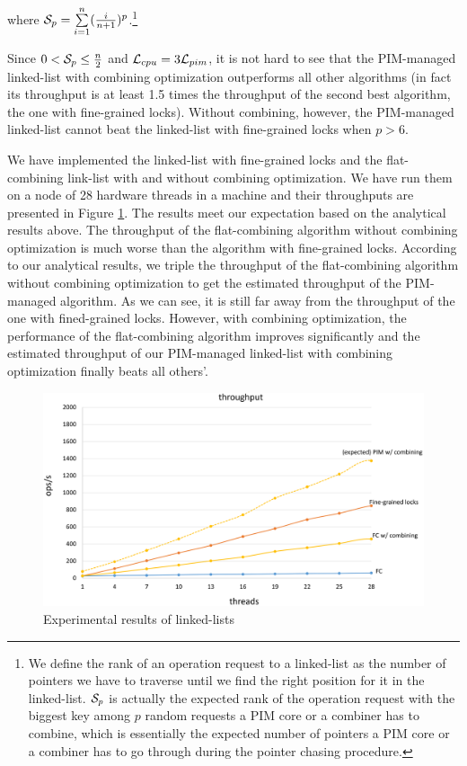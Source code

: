 where $\mathcal{S}_{p} = \sum\limits_{i=1}^{n} ({i \over n+1})^{p}$.\footnote {
We define the rank of an operation request to a linked-list as the number of pointers
we have to traverse until we find the right position for it in the linked-list.
$\mathcal{S}_{p}$ is actually the expected rank of the operation request with the biggest key
among $p$ random requests a PIM core or a combiner has to combine,
which is essentially the expected number of pointers a PIM core or a combiner
has to go through during the pointer chasing procedure.}

Since $0 < \mathcal{S}_{p} \le {n \over 2}$ and $\mathcal{L}_{cpu} = 3\mathcal{L}_{pim}$,
it is not hard to see that the PIM-managed linked-list with
combining optimization outperforms all other algorithms
(in fact its throughput is at least 1.5 times the throughput of
the second best algorithm, the one with fine-grained locks).
Without combining, however, the PIM-managed linked-list cannot
beat the linked-list with fine-grained locks when $p > 6$.

We have implemented the linked-list with fine-grained locks
and the flat-combining link-list with and without combining optimization.
We have run them on a node of 28 hardware threads in a machine
and their throughputs are presented in Figure \ref{figure:linkedlist_data}.
The results meet our expectation based on the analytical results above.
The throughput of the flat-combining algorithm without combining optimization
is much worse than the algorithm with fine-grained locks.
According to our analytical results, we triple the throughput of the
flat-combining algorithm without combining optimization to get the estimated
throughput of the PIM-managed algorithm. As we can see,
it is still far away from the throughput of the one with fined-grained locks.
However, with combining optimization, the performance of the flat-combining
algorithm improves significantly and the estimated throughput of our PIM-managed
linked-list with combining optimization finally beats all others'.

\begin{figure}[ht!]
\centering
\includegraphics[width=.8\linewidth]{linkedlist_data.eps}
\caption{Experimental results of linked-lists}
\label{figure:linkedlist_data}
\end{figure}

